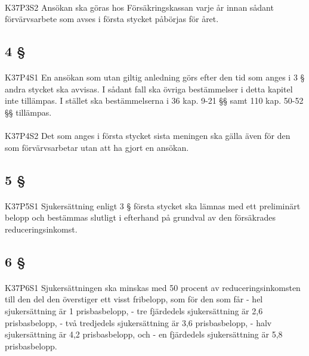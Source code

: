 \documentclass[a4paper,notitlepage,openany,10pt]{book}
\begin{document}
\paragraph*{}
{\tiny K37P3S2}
Ansökan ska göras hos Försäkringskassan varje år innan sådant förvärvsarbete som avses i första stycket påbörjas för året.
\subsection*{4 §}
\paragraph*{}
{\tiny K37P4S1}
En ansökan som utan giltig anledning görs efter den tid som anges i 3 § andra stycket ska avvisas. I sådant fall ska övriga bestämmelser i detta kapitel inte tillämpas. I stället ska bestämmelserna i 36 kap. 9-21 §§ samt 110 kap. 50-52 §§ tillämpas.
\paragraph*{}
{\tiny K37P4S2}
Det som anges i första stycket sista meningen ska gälla även för den som förvärvsarbetar utan att ha gjort en ansökan.
\subsection*{5 §}
\paragraph*{}
{\tiny K37P5S1}
Sjukersättning enligt 3 § första stycket ska lämnas med ett preliminärt belopp och bestämmas slutligt i efterhand på grundval av den försäkrades reduceringsinkomst.
\subsection*{6 §}
\paragraph*{}
{\tiny K37P6S1}
Sjukersättningen ska minskas med 50 procent av reduceringsinkomsten till den del den överstiger ett visst fribelopp, som för den som får
\newline - hel sjukersättning är 1 prisbasbelopp, - tre fjärdedels sjukersättning är 2,6 prisbasbelopp,
\newline - två tredjedels sjukersättning är 3,6 prisbasbelopp, - halv sjukersättning är 4,2 prisbasbelopp, och - en fjärdedels sjukersättning är 5,8 prisbasbelopp.
\end{document}
